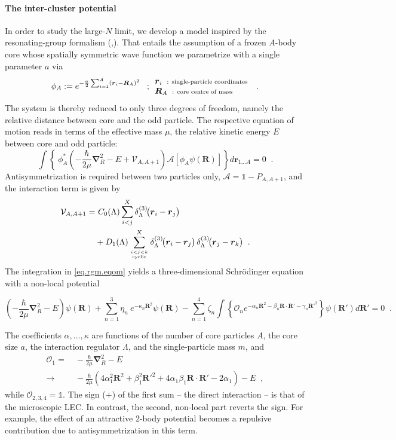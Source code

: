 \documentclass[aps,nofootinbib,prl,showpacs,twocolumn,groupedaddress,superscriptaddress]
{revtex4}
\newcommand{\la}{\label}
\newcommand{\be}{\begin{equation}}
\newcommand{\ee}{\end{equation}}
\newcommand{\ve}[1]{\ensuremath{\boldsymbol{#1}}}
\newcommand{\ddrei}[1]{\delta_{\tiny \Lambda}^{(3)}\!\big(#1\big)}
\begin{document}
\paragraph{The inter-cluster potential}
In order to study the large-$N$ limit, we develop a model inspired by the resonating-group formalism
(\cite{Wheeler:1937zz},\cite{Wildermuth1977s}).
That entails the assumption of a frozen $A$-body core whose spatially symmetric wave function we
parametrize with a single parameter $a$ via
\be\label{eq.rgm.corewfkt}
\phi_A:=e^{-\frac{a}{2}\sum_{i=1}^A\left(\ve{r}_i-\ve{R}_A\right)^2}\;\;\;;
\begin{array}{l}
     \ve{r}_i\;\;\text{\scriptsize : single-particle coordinates}  \\
     \ve{R}_A\;\;\text{\scriptsize : core centre of mass}
\end{array}\;\;.
\ee
The system is thereby reduced to only three degrees of freedom, namely the relative distance
between core and the odd particle. The respective equation of motion reads in terms of the effective
mass $\mu$, the relative kinetic energy $E$ between core and odd particle:
\be\label{eq.rgm.eqom}
\int\left\lbrace~\phi^*_A\left(-\frac{\hbar}{2\mu}\ve{\nabla}_R^2-E+\mathcal{V}_{A,A+1}\right)
\mathcal{A}\left[\phi_A\psi(\ve{R})\right]\right\rbrace d\ve{r}_{1\ldots A}=0\;\;.
\ee
Antisymmetrization is required between two particles only, $\mathcal{A}=\mathbb{1}-P_{A,A+1}$, and the
interaction term is given by
\begin{align}
\mathcal{V}_{A,A+1}=&~C_0(\Lambda)\sum_{i<j}^X\ddrei{\ve{r}_i-\ve{r}_j}\\
&+D_1(\Lambda)\sum^X_{i<j<k\atop\text{\tiny cyclic}}\ddrei{\ve{r}_i-\ve{r}_j}\,
\ddrei{\ve{r}_j-\ve{r}_k}\;\;.\nonumber
\end{align}
The integration in \eqref{eq.rgm.eqom} yields a three-dimensional Schr\"odinger equation with a
non-local potential
\begin{widetext}
\be\label{eq.rgm.sglnonloc}
\left(-\frac{\hbar}{2\mu}\ve{\nabla}_R^2-E\right)\psi(\ve{R})+\sum_{n=1}^3\eta_n~e^{-\kappa_n\ve{R}^2}\psi(\ve{R})-
\sum_{n=1}^4\zeta_n\int\left\lbrace\mathcal{O}_ne^{-\alpha_n\ve{R}^2-\beta_n\ve{R}\cdot\ve{R}'-\gamma_n\ve{R}'^2}\right\rbrace\psi(\ve{R}') d\ve{R}'=0\;\;.
\ee
\end{widetext}
The coefficients $\alpha,\ldots,\kappa$ are functions of the number of
core particles $A$,
the core size $a$, the interaction regulator $\Lambda$,
and the single-particle mass $m$, and 
\begin{align}\la{eq.exop}
\mathcal{O}_1=&~-\frac{\hbar}{2\mu}\ve{\nabla}_R^2-E\\
\to&~-\frac{\hbar}{2\mu}\left(4\alpha_1^2\ve{R}^2+\beta_1^2\ve{R}'^2
+4\alpha_1\beta_1\ve{R}\cdot\ve{R}'-2\alpha_1\right)-E\;\;,\nonumber
\end{align}
while $\mathcal{O}_{2,3,4}=\mathbb{1}$. The sign ($+$) of the first sum -- the direct
interaction -- is that of the microscopic LEC. In contrast, the second, non-local
part reverts the sign. For example, the effect of an attractive 2-body potential
becomes a repulsive contribution due to antisymmetrization in this term.
\end{document}
